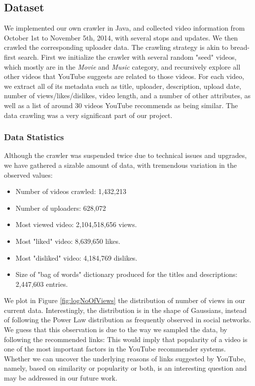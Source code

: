 \subsection{Dataset}
	We implemented our own crawler in Java, and collected video information from October 1st to November 5th, 2014, with several stops and updates.  We then crawled the corresponding uploader data. The crawling strategy is akin to bread-first search. First we initialize the crawler with several random "seed" videos, which mostly are in the \textit{Movie} and \textit{Music} category, and recursively explore all other videos that YouTube suggests are related to those videos. For each video, we extract all of its metadata such as title, uploader, description, upload date, number of views/likes/dislikes, video length, and a number of other attributes, as well as a list of around 30 videos YouTube recommends as being similar.  The data crawling was a very significant part of our project.

	\subsubsection{Data Statistics}
		Although the crawler was suspended twice due to technical issues and upgrades, we have gathered a sizable amount of data, with tremendous  variation in the observed values:

		\begin{itemize}
			\item Number of videos crawled: 1,432,213
			\item Number of uploaders: 628,072
			\item Most viewed video: 2,104,518,656 views.
			\item Most "liked" video: 8,639,650 likes.
			\item Most "disliked" video: 4,184,769 dislikes.
			\item Size of "bag of words" dictionary produced for the titles and descriptions: 2,447,603 entries.
		\end{itemize}

		We plot in Figure \ref{fig:logNoOfViews} the distribution of number of views in our current data. Interestingly, the distribution is in the shape of Gaussians, instead of following the Power Law distribution as frequently observed in social networks. We guess that this observation is due to the way we sampled the data, by following the recommended links: This would imply that popularity of a video is one of the most important factors in the YouTube recommender systems. Whether we can uncover the underlying reasons of links suggested by YouTube, namely, based on similarity or popularity or both, is an interesting question and may be addressed in our future work.
		
